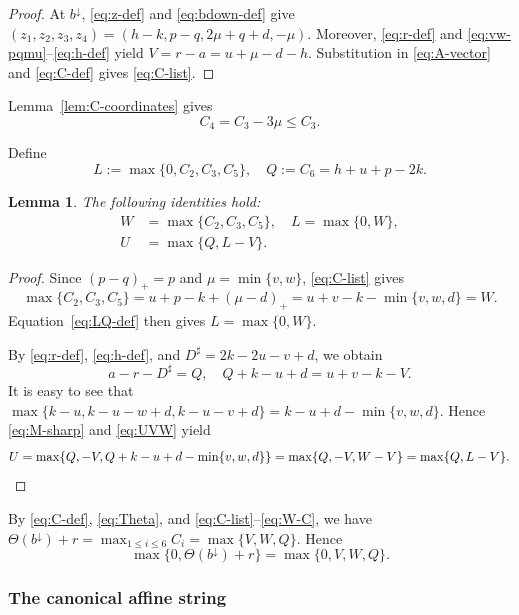 \documentclass[11pt,reqno]{amsart}
\numberwithin{table}{section}
\numberwithin{equation}{section}
\theoremstyle{plain}
\newtheorem{lemma}[theorem]{Lemma}
\theoremstyle{definition}
\begin{document}
\begin{proof}
	At \(b^\downarrow\),
	\eqref{eq:z-def} and \eqref{eq:bdown-def} give $(z_1,z_2,z_3,z_4)
	=
	(h-k,p-q,2\mu+q+d,-\mu)$.
	Moreover, \eqref{eq:r-def} and \eqref{eq:vw-pqmu}--\eqref{eq:h-def}
	 yield $V=r-a=u+\mu-d-h$.
	Substitution in \eqref{eq:A-vector} and
	\eqref{eq:C-def} gives \eqref{eq:C-list}.
\end{proof}

Lemma~\ref{lem:C-coordinates} gives
\begin{equation}\label{eq:C4-C3}
	C_4=C_3-3\mu\le C_3.
\end{equation}

Define
\begin{equation}\label{eq:LQ-def}
	L:=\max\{0,C_2,C_3,C_5\},
	\quad
	Q:=C_6=h+u+p-2k.
\end{equation}

\begin{lemma}
	\label{lem:UVW-compression}
	The following identities hold:
	\begin{align}
		W&=\max\{C_2,C_3,C_5\},
		\quad
		L=\max\{0,W\},
		\label{eq:W-C}\\
		U&=\max\{Q,L-V\}.
		\label{eq:U-QLV}
	\end{align}
\end{lemma}

\begin{proof}
	Since \((p-q)_+=p\) and \(\mu=\min\{v,w\}\),
	\eqref{eq:C-list} gives
	\[
		\max\{C_2,C_3,C_5\}
		=u+p-k+(\mu-d)_+
		=u+v-k-\min\{v,w,d\}
		=W.
	\]
	Equation~\eqref{eq:LQ-def} then gives \(L=\max\{0,W\}\).
	
	By \eqref{eq:r-def}, \eqref{eq:h-def}, and
	\(D^\sharp=2k-2u-v+d\), we obtain
	\[
	a-r-D^\sharp=Q,
	\quad
	Q+k-u+d=u+v-k-V.
	\]
It is easy to see that \(\max\{k-u,k-u-w+d,k-u-v+d\}
=k-u+d-\min\{v,w,d\}\).
	Hence \eqref{eq:M-sharp} and \eqref{eq:UVW} yield
	\[
		U
		=\max\{
		Q,-V,Q+k-u+d-\min\{v,w,d\}
		\}
		=\max\{Q,-V,W-V\}
		=\max\{Q,L-V\}.\qedhere
	\]
\end{proof}

By \eqref{eq:C-def}, \eqref{eq:Theta}, and
\eqref{eq:C-list}--\eqref{eq:W-C}, we have $\Theta(b^\downarrow)+r
=
\max_{1\le i\le6}C_i
=
\max\{V,W,Q\}$.
Hence
\begin{equation}\label{eq:t-defects}
	\max\{0,\Theta(b^\downarrow)+r\}
	=
	\max\{0,V,W,Q\}.
\end{equation}

\subsubsection{The canonical affine string}
\end{document}
